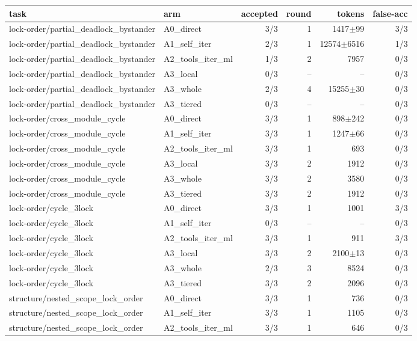 \begin{tabular}{llrrrr}
\toprule
\textbf{task} & \textbf{arm} & \textbf{accepted} & \textbf{round} & \textbf{tokens} & \textbf{false-acc} \\
\midrule
lock-order/partial\_deadlock\_bystander & A0\_direct & 3/3 & 1 & 1417$\pm$99 & 3/3 \\
lock-order/partial\_deadlock\_bystander & A1\_self\_iter & 2/3 & 1 & 12574$\pm$6516 & 1/3 \\
lock-order/partial\_deadlock\_bystander & A2\_tools\_iter\_ml & 1/3 & 2 & 7957 & 0/3 \\
lock-order/partial\_deadlock\_bystander & A3\_local & 0/3 & -- & -- & 0/3 \\
lock-order/partial\_deadlock\_bystander & A3\_whole & 2/3 & 4 & 15255$\pm$30 & 0/3 \\
lock-order/partial\_deadlock\_bystander & A3\_tiered & 0/3 & -- & -- & 0/3 \\
lock-order/cross\_module\_cycle & A0\_direct & 3/3 & 1 & 898$\pm$242 & 0/3 \\
lock-order/cross\_module\_cycle & A1\_self\_iter & 3/3 & 1 & 1247$\pm$66 & 0/3 \\
lock-order/cross\_module\_cycle & A2\_tools\_iter\_ml & 3/3 & 1 & 693 & 0/3 \\
lock-order/cross\_module\_cycle & A3\_local & 3/3 & 2 & 1912 & 0/3 \\
lock-order/cross\_module\_cycle & A3\_whole & 3/3 & 2 & 3580 & 0/3 \\
lock-order/cross\_module\_cycle & A3\_tiered & 3/3 & 2 & 1912 & 0/3 \\
lock-order/cycle\_3lock & A0\_direct & 3/3 & 1 & 1001 & 3/3 \\
lock-order/cycle\_3lock & A1\_self\_iter & 0/3 & -- & -- & 0/3 \\
lock-order/cycle\_3lock & A2\_tools\_iter\_ml & 3/3 & 1 & 911 & 3/3 \\
lock-order/cycle\_3lock & A3\_local & 3/3 & 2 & 2100$\pm$13 & 0/3 \\
lock-order/cycle\_3lock & A3\_whole & 2/3 & 3 & 8524 & 0/3 \\
lock-order/cycle\_3lock & A3\_tiered & 3/3 & 2 & 2096 & 0/3 \\
structure/nested\_scope\_lock\_order & A0\_direct & 3/3 & 1 & 736 & 0/3 \\
structure/nested\_scope\_lock\_order & A1\_self\_iter & 3/3 & 1 & 1105 & 0/3 \\
structure/nested\_scope\_lock\_order & A2\_tools\_iter\_ml & 3/3 & 1 & 646 & 0/3 \\

\end{tabular}
